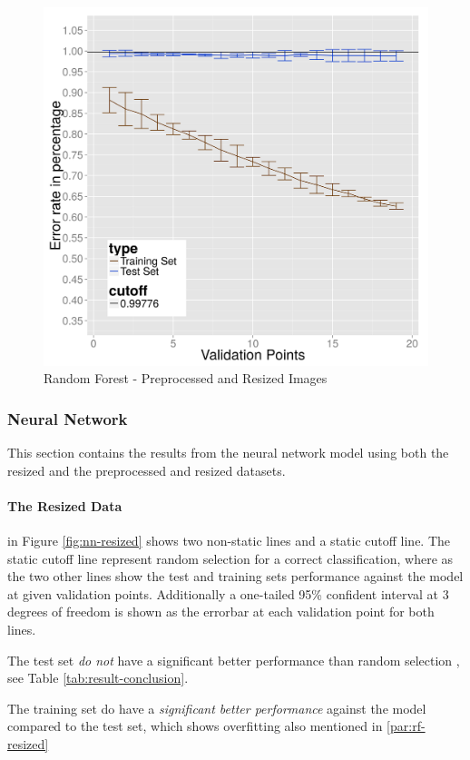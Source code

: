 \begin{figure}
  \centering
  \includegraphics[width=0.9\linewidth]{Images/DRFpreprocessed}
  \caption{Random Forest - Preprocessed and Resized Images}
  \label{fig:rf-preprocessed}
\end{figure}

\subsubsection{Neural Network}
\label{subsubsec:neuralnetwork}
This section contains the results from the neural network model using both the resized and the preprocessed and resized datasets.

\paragraph{The Resized Data}
in Figure \ref{fig:nn-resized} shows two non-static lines and a static cutoff line.
The static cutoff line represent random selection for a correct classification, where as the two other lines show the test and training sets performance against the model at given validation points. Additionally a one-tailed 95\% confident interval at 3 degrees of freedom is shown as the errorbar at each validation point for both lines.

The test set \emph{do not} have a significant better performance than random selection
, see Table \ref{tab:result-conclusion}.

The training set do have a \emph{significant better performance} against the model compared to the test set, which shows overfitting also mentioned in \ref{par:rf-resized}


